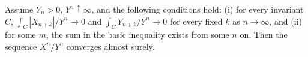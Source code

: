 Assume $Y_n > 0$, $Y^n \uparrow \infty$, and the following conditions hold: (i) for every invariant $C$, $\int_C |X_{n+k}|/Y^n \to 0$ and $\int_C Y_{n+k}/Y^n \to 0$ for every fixed $k$ as $n \to \infty$, and (ii) for some $m$, the sum in the basic inequality exists from some $n$ on. Then the sequence $X^n/Y^n$ converges almost surely.
